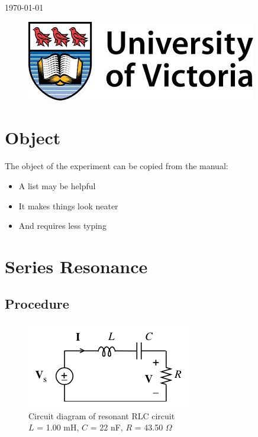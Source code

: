 \documentclass[12pt]{article}
\begin{document}
\begin{titlepage}
{\large \today}\\ %

\begin{figure}[b]	 %
	\centering
	\includegraphics[scale=0.3]{UVic_logo}
\end{figure}

\end{titlepage}





\section{Object}\label{sec:object}
The object of the experiment can be copied from the manual:
\begin{itemize}
	\item A list may be helpful
	\item It makes things look neater
	\item And requires less typing
\end{itemize}

\section{Series Resonance}\label{sec:resonance}
\subsection{Procedure}\label{sec:res_procedure}
\begin{figure}[h]
	\centering
	\includegraphics[scale=0.75]{resonance_diagram}
	\caption{Circuit diagram of resonant RLC circuit \\ $L$ = 1.00 mH, $C$ = 22 nF, $R$ = 43.50 $\Omega$}
	\label{fig:res_diagram}
\end{figure}
\end{document}
